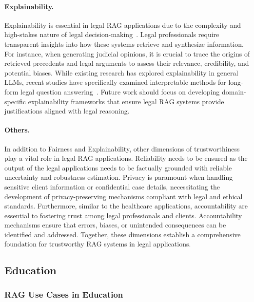 \paragraph{Explainability.}
Explainability is essential in legal RAG applications due to the complexity and high-stakes nature of legal decision-making~\cite{cui2022surveylegaljudgmentprediction, chen2024survey}. Legal professionals require transparent insights into how these systems retrieve and synthesize information. For instance, when generating judicial opinions, it is crucial to trace the origins of retrieved precedents and legal arguments to assess their relevance, credibility, and potential biases. While existing research has explored explainability in general LLMs, recent studies have specifically examined interpretable methods for long-form legal question answering~\cite{louis2023interpretablelongformlegalquestion}. Future work should focus on developing domain-specific explainability frameworks that ensure legal RAG systems provide justifications aligned with legal reasoning.

\paragraph{Others.}
In addition to Fairness and Explainability, other dimensions of trustworthiness play a vital role in legal RAG applications. Reliability needs to be ensured as the output of the legal applications needs to be factually grounded with reliable uncertainty and robustness estimation. Privacy is paramount when handling sensitive client information or confidential case details, necessitating the development of privacy-preserving mechanisms compliant with legal and ethical standards. Furthermore, similar to the healthcare applications, accountability are essential to fostering trust among legal professionals and clients. Accountability mechanisms ensure that errors, biases, or unintended consequences can be identified and addressed. Together, these dimensions establish a comprehensive foundation for trustworthy RAG systems in legal applications.

\subsection{Education}
\subsubsection{RAG Use Cases in Education}
